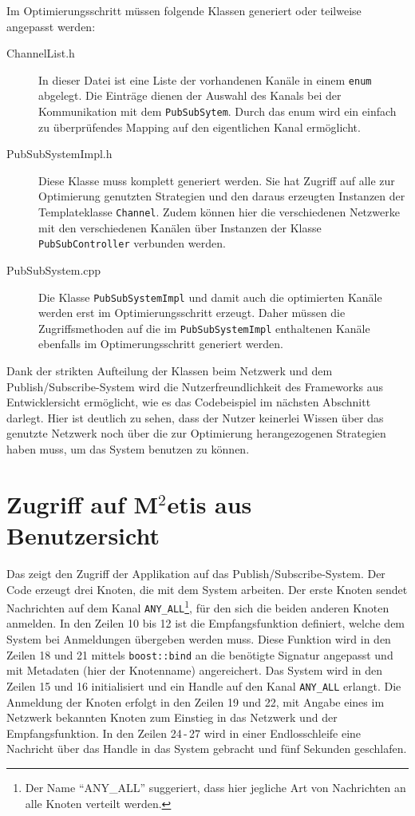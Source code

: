 Im Optimierungsschritt müssen folgende Klassen generiert oder teilweise angepasst werden:
\begin{description}
\item[ChannelList.h] In dieser Datei ist eine Liste der vorhandenen Kanäle in einem \texttt{enum} abgelegt. Die Einträge dienen der Auswahl des Kanals bei der Kommunikation mit dem \texttt{PubSubSytem}. Durch das enum wird ein einfach zu überprüfendes Mapping auf den eigentlichen Kanal ermöglicht.
\item[PubSubSystemImpl.h] Diese Klasse muss komplett generiert werden. Sie hat Zugriff auf alle zur Optimierung genutzten Strategien und den daraus erzeugten Instanzen der Templateklasse \texttt{Channel}. Zudem können hier die verschiedenen Netzwerke mit den verschiedenen Kanälen über Instanzen der Klasse \texttt{PubSubController} verbunden werden.
\item[PubSubSystem.cpp] Die Klasse \texttt{PubSubSystemImpl} und damit auch die optimierten Kanäle werden erst im Optimierungsschritt erzeugt. Daher müssen die Zugriffsmethoden auf die im \texttt{PubSubSystemImpl} enthaltenen Kanäle ebenfalls im Optimerungsschritt generiert werden.
\end{description}

Dank der strikten Aufteilung der Klassen beim Netzwerk und dem Publish/Subscribe-System wird die Nutzerfreundlichkeit des Frameworks aus Entwicklersicht ermöglicht, wie es das Codebeispiel im nächsten Abschnitt darlegt. Hier ist deutlich zu sehen, dass der Nutzer keinerlei Wissen über das genutzte Netzwerk noch über die zur Optimierung herangezogenen Strategien haben muss, um das System benutzen zu können.

\section*{Zugriff auf M$^2$etis aus Benutzersicht}
Das  zeigt den Zugriff der Applikation auf das Publish/Subscribe-System. Der Code erzeugt drei Knoten, die mit dem System arbeiten. Der erste Knoten sendet Nachrichten auf dem Kanal \texttt{ANY\_ALL}\footnote{Der Name \enquote{ANY\_ALL} suggeriert, dass hier jegliche Art von Nachrichten an alle Knoten verteilt werden.}, für den sich die beiden anderen Knoten anmelden. In den Zeilen 10 bis 12 ist die Empfangsfunktion definiert, welche dem System bei Anmeldungen übergeben werden muss. Diese Funktion wird in den Zeilen 18 und 21 mittels \texttt{boost::bind} an die benötigte Signatur angepasst und mit Metadaten (hier der Knotenname) angereichert. Das System wird in den Zeilen 15 und 16 initialisiert und ein Handle auf den Kanal \texttt{ANY\_ALL} erlangt. Die Anmeldung der Knoten erfolgt in den Zeilen 19 und 22, mit Angabe eines im Netzwerk bekannten Knoten zum Einstieg in das Netzwerk und der Empfangsfunktion. In den Zeilen 24\,-\,27 wird in einer Endlosschleife eine Nachricht über das Handle in das System gebracht und fünf Sekunden geschlafen.


